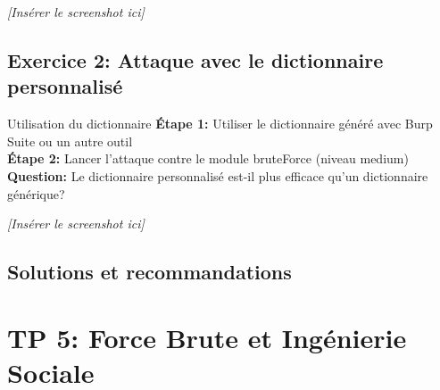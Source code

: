 \documentclass[12pt,a4paper]{article}
\begin{document}
\begin{answerbox}
\vspace{7cm}
\end{answerbox}

\begin{screenshotbox}
\centering
\textit{[Insérer le screenshot ici]}
\end{screenshotbox}

\subsection{Exercice 2: Attaque avec le dictionnaire personnalisé}

\begin{exercicebox}{Utilisation du dictionnaire}
\textbf{Étape 1:} Utiliser le dictionnaire généré avec Burp Suite ou un autre outil\\
\textbf{Étape 2:} Lancer l'attaque contre le module bruteForce (niveau medium)\\
\textbf{Question:} Le dictionnaire personnalisé est-il plus efficace qu'un dictionnaire générique?
\end{exercicebox}

\begin{answerbox}
\vspace{7cm}
\end{answerbox}

\begin{screenshotbox}
\centering
\textit{[Insérer le screenshot ici]}
\end{screenshotbox}

\subsection{Solutions et recommandations}

\begin{answerbox}
\vspace{7cm}
\end{answerbox}

\newpage

\section{TP 5: Force Brute et Ingénierie Sociale}
\end{document}
